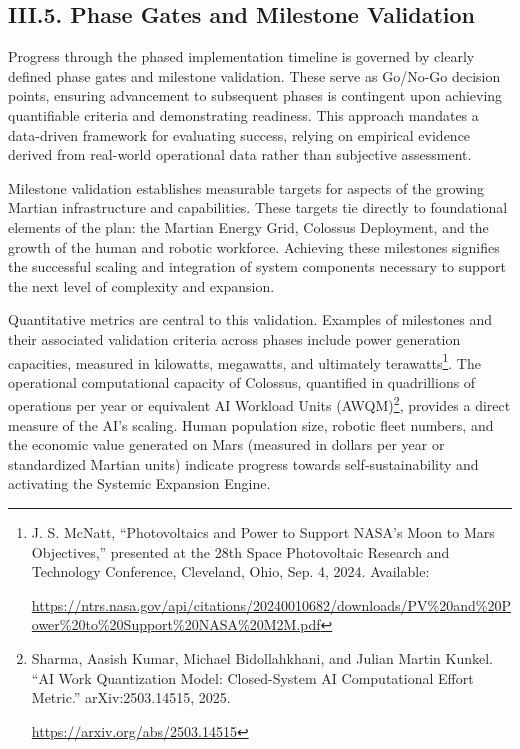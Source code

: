 \documentclass[fontsize=10pt, oneside, DIV=calc]{scrartcl}
\begin{document}
\subsection*{III.5. Phase Gates and Milestone Validation}



\medskip

\noindent
Progress through the phased implementation timeline is governed by clearly defined phase gates and milestone validation. These serve as Go/No-Go decision points, ensuring advancement to subsequent phases is contingent upon achieving quantifiable criteria and demonstrating readiness. This approach mandates a data-driven framework for evaluating success, relying on empirical evidence derived from real-world operational data rather than subjective assessment.

\medskip

\noindent
Milestone validation establishes measurable targets for aspects of the growing Martian infrastructure and capabilities. These targets tie directly to foundational elements of the plan: the Martian Energy Grid, Colossus Deployment, and the growth of the human and robotic workforce. Achieving these milestones signifies the successful scaling and integration of system components necessary to support the next level of complexity and expansion.

\medskip

\noindent
Quantitative metrics are central to this validation. Examples of milestones and their associated validation criteria across phases include power generation capacities, measured in kilowatts, megawatts, and ultimately terawatts\footnote{J. S. McNatt, ``Photovoltaics and Power to Support NASA’s Moon to Mars Objectives,'' presented at the 28th Space Photovoltaic Research and Technology Conference, Cleveland, Ohio, Sep. 4, 2024. Available: 







\href{https://ntrs.nasa.gov/api/citations/20240010682/downloads/PV\%20and\%20Power\%20to\%20Support\%20NASA\%20M2M.pdf}\url{https://ntrs.nasa.gov/api/citations/20240010682/downloads/PV\%20and\%20Power\%20to\%20Support\%20NASA\%20M2M.pdf}}. The operational computational capacity of Colossus, quantified in quadrillions of operations per year or equivalent AI Workload Units (AWQM)\footnote{Sharma, Aasish Kumar, Michael Bidollahkhani, and Julian Martin Kunkel. ``AI Work Quantization Model: Closed-System AI Computational Effort Metric.'' arXiv:2503.14515, 2025. 







\href{https://arxiv.org/abs/2503.14515}\url{https://arxiv.org/abs/2503.14515}}, provides a direct measure of the AI's scaling. Human population size, robotic fleet numbers, and the economic value generated on Mars (measured in dollars per year or standardized Martian units) indicate progress towards self-sustainability and activating the Systemic Expansion Engine.
\end{document}
